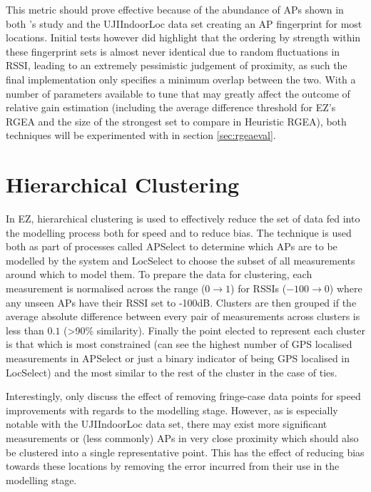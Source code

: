 \documentclass{UoYCSproject}
\begin{document}
            This metric should prove effective because of the abundance of APs shown in both \citeauthor{chintalapudi2010indoor}'s study \citep{chintalapudi2010indoor} and the UJIIndoorLoc data set \citep{torres2014ujiindoorloc} creating an AP fingerprint for most locations. Initial tests however did highlight that the ordering by strength within these fingerprint sets is almost never identical due to random fluctuations in RSSI, leading to an extremely pessimistic judgement of proximity, as such the final implementation only specifies a minimum overlap between the two. With a number of parameters available to tune that may greatly affect the outcome of relative gain estimation (including the average difference threshold for EZ's RGEA and the size of the strongest set to compare in Heuristic RGEA), both techniques will be experimented with in section \ref{sec:rgeaeval}.
		
		\section{Hierarchical Clustering}
        \label{sec:datacluster}
        
	        In EZ, hierarchical clustering is used to effectively reduce the set of data fed into the modelling process both for speed and to reduce bias. The technique is used both as part of processes called APSelect to determine which APs are to be modelled by the system and LocSelect to choose the subset of all measurements around which to model them. To prepare the data for clustering, each measurement is normalised across the range ($0 \rightarrow 1$) for RSSIs ($-100 \rightarrow 0$) where any unseen APs have their RSSI set to -100dB. Clusters are then grouped if the average absolute difference between every pair of measurements across clusters is less than $0.1$ (>90\% similarity). Finally the point elected to represent each cluster is that which is most constrained (can see the highest number of GPS localised measurements in APSelect or just a binary indicator of being GPS localised in LocSelect) and the most similar to the rest of the cluster in the case of ties.
	        
	        Interestingly, \citet{chintalapudi2010indoor} only discuss the effect of removing fringe-case data points for speed improvements with regards to the modelling stage. However, as is especially notable with the UJIIndoorLoc data set, there may exist more significant measurements or (less commonly) APs in very close proximity which should also be clustered into a single representative point. This has the effect of reducing bias towards these locations by removing the error incurred from their use in the modelling stage.
	        
\end{document}
